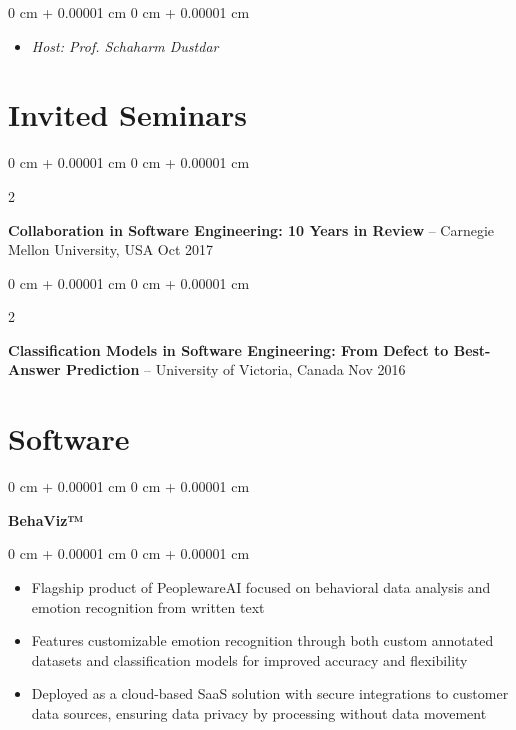 \documentclass[10pt, a4paper]{article}
\newenvironment{highlights}{
    \begin{itemize}[
        topsep=0.10 cm,
        parsep=0.10 cm,
        partopsep=0pt,
        itemsep=0pt,
        leftmargin=0 cm + 10pt
    ]
}{
    \end{itemize}
} %
\newenvironment{onecolentry}{
    \begin{adjustwidth}{
        0 cm + 0.00001 cm
    }{
        0 cm + 0.00001 cm
    }
}{
    \end{adjustwidth}
} %
\newenvironment{twocolentry}[2][]{
    \onecolentry
    \def\secondColumn{#2}
    \setcolumnwidth{\fill, 4.5 cm}
    \begin{paracol}{2}
}{
    \switchcolumn \raggedleft \secondColumn
    \end{paracol}
    \endonecolentry
} %
\begin{document}
        \vspace{0.10 cm}
        \begin{onecolentry}
            \begin{highlights}
                \item \textit{Host: Prof. Schaharm Dustdar}
            \end{highlights}
        \end{onecolentry}



    
    \section{Invited Seminars}



        
        \begin{twocolentry}{
            Oct 2017
        }
            \textbf{Collaboration in Software Engineering: 10 Years in Review} -- Carnegie Mellon University, USA\end{twocolentry}



        \vspace{0.2 cm}

        \begin{twocolentry}{
            Nov 2016
        }
            \textbf{Classification Models in Software Engineering: From Defect to Best-Answer Prediction} -- University of Victoria, Canada\end{twocolentry}




    
    \section{Software}



        
        \begin{onecolentry}
            \textbf{BehaViz™}\end{onecolentry}

        \vspace{0.10 cm}
        \begin{onecolentry}
            \begin{highlights}
                \item Flagship product of PeoplewareAI focused on behavioral data analysis and emotion recognition from written text
                \item Features customizable emotion recognition through both custom annotated datasets and classification models for improved accuracy and flexibility
                \item Deployed as a cloud-based SaaS solution with secure integrations to customer data sources, ensuring data privacy by processing without data movement
            \end{highlights}
        \end{onecolentry}
\end{document}
